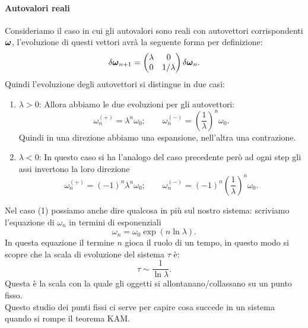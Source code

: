 \paragraph{Autovalori reali}%
\label{par:Autovalori reali}
Consideriamo il caso in cui gli autovalori sono reali con autovettori corrispondenti $\boldsymbol{\omega}$, l'evoluzione di questi vettori avrà la seguente forma per definizione:
\[
    \delta\boldsymbol{\omega}_{n+1} = 
    \begin{pmatrix} 
	\lambda  & 0 \\
	0 & 1 /\lambda
    \end{pmatrix} 
    \delta\boldsymbol{\omega}_n
.\] 
Quindi l'evoluzione degli autovettori si distingue in due casi:
\begin{enumerate}
    \item $\lambda > 0$:
	Allora abbiamo le due evoluzioni per gli autovettori:
	\[
	    \omega^{(+)}_n = \lambda^n \omega_0; \qquad \omega^{(-)}_n = \left(\frac{1}{\lambda}\right)^n \omega_0
	.\] 
	Quindi in una direzione abbiamo una espansione, nell'altra una contrazione.
    \item $\lambda < 0$: In questo caso si ha l'analogo del caso precedente però ad ogni step gli assi invertono la loro direzione
	\[
	    \omega^{(+)}_n = (-1)^n\lambda^n \omega_0; \qquad \omega^{(-)}_n = (-1)^n\left(\frac{1}{\lambda}\right)^n \omega_0
	.\] 
\end{enumerate}
Nel caso (1) possiamo anche dire qualcosa in più sul nostro sistema: scriviamo l'equazione di $\omega_n$ in termini di esponenziali
\[
    \omega_n = \omega_0 \exp (n\ln\lambda)
.\] 
In questa equazione il termine $n$ gioca il ruolo di un tempo, in questo modo si scopre che la scala di evoluzione del sistema $\tau$ è:
\[
    \tau\sim \frac{1}{\ln\lambda}
.\] 
Questa è la scala con la quale gli oggetti si allontanano/collassano su un punto fisso.\\
Questo studio dei punti fissi ci serve per capire cosa succede in un sistema quando si rompe il teorema KAM.

